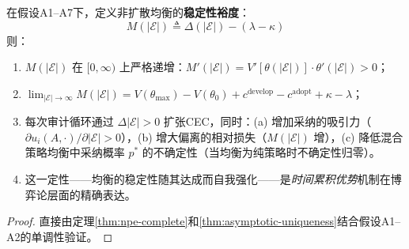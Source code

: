 \documentclass[12pt,a4paper]{ctexart}
\theoremstyle{definition}
\theoremstyle{remark}
\begin{document}
\begin{corollary}[非扩散均衡的单调自强化性质]
\label{cor:self-reinforcing}
在假设A1--A7下，定义非扩散均衡的\textbf{稳定性裕度}：
\begin{equation}
M(|\mathcal{E}|) \triangleq \Delta(|\mathcal{E}|) - (\lambda - \kappa)
\end{equation}
则：
\begin{enumerate}[label=(\roman*)]
\item $M(|\mathcal{E}|)$ 在 $[0, \infty)$ 上严格递增：$M'(|\mathcal{E}|) = V'[\theta(|\mathcal{E}|)] \cdot \theta'(|\mathcal{E}|) > 0$；
\item $\lim_{|\mathcal{E}| \to \infty} M(|\mathcal{E}|) = V(\theta_{\max}) - V(\theta_0) + c^{\text{develop}} - c^{\text{adopt}} + \kappa - \lambda$；
\item 每次审计循环通过 $\Delta |\mathcal{E}| > 0$ 扩张CEC，同时：(a) 增加采纳的吸引力（$\partial u_i(A, \cdot) / \partial |\mathcal{E}| > 0$），(b) 增大偏离的相对损失（$M(|\mathcal{E}|)$ 增），(c) 降低混合策略均衡中采纳概率 $p^*$ 的不确定性（当均衡为纯策略时不确定性归零）。
\item 这一定性——均衡的稳定性随其达成而自我强化——是\textit{时间累积优势}机制在博弈论层面的精确表达。
\end{enumerate}
\end{corollary}

\begin{proof}
直接由定理\ref{thm:npe-complete}和\ref{thm:asymptotic-uniqueness}结合假设A1--A2的单调性验证。
\end{proof}
\end{document}

